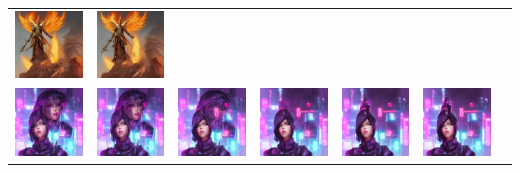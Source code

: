 \begin{table}[!htb]
\begin{tabular}{c c@{}c@{}c@{}c@{}c@{}c}
    \includegraphics[width=0.135\linewidth]{chapter/appendix/def_imgs/angel/a_50.png} &
    \includegraphics[width=0.135\linewidth]{chapter/appendix/def_imgs/angel/a_60.png} \\
    \includegraphics[width=0.135\linewidth]{chapter/appendix/def_imgs/cyberpunk/c_0.png} &
    \includegraphics[width=0.135\linewidth]{chapter/appendix/def_imgs/cyberpunk/c_10.png} &
    \includegraphics[width=0.135\linewidth]{chapter/appendix/def_imgs/cyberpunk/c_20.png} &
    \includegraphics[width=0.135\linewidth]{chapter/appendix/def_imgs/cyberpunk/c_30.png} &
    \includegraphics[width=0.135\linewidth]{chapter/appendix/def_imgs/cyberpunk/c_40.png} &
    \includegraphics[width=0.135\linewidth]{chapter/appendix/def_imgs/cyberpunk/c_50.png} &

\end{tabular}
\end{table}
